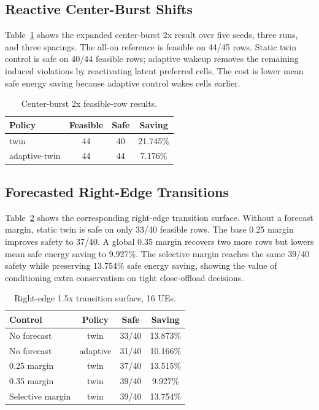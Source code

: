 \documentclass[10pt,twocolumn]{article}
\begin{document}
\subsection{Reactive Center-Burst Shifts}

Table~\ref{tab:center} shows the expanded center-burst 2x result over five
seeds, three runs, and three spacings.  The all-on reference is feasible on
44/45 rows.  Static twin control is safe on 40/44 feasible rows; adaptive
wakeup removes the remaining induced violations by reactivating latent preferred
cells.  The cost is lower mean safe energy saving because adaptive control wakes
cells earlier.

\begin{table}[H]
\centering
\caption{Center-burst 2x feasible-row results.}
\label{tab:center}
\begin{tabular}{lccc}
\toprule
Policy & Feasible & Safe & Saving \\
\midrule
twin & 44 & 40 & 21.745\% \\
adaptive-twin & 44 & 44 & 7.176\% \\
\bottomrule
\end{tabular}
\end{table}

\subsection{Forecasted Right-Edge Transitions}

Table~\ref{tab:right-edge} shows the corresponding right-edge transition
surface.  Without a forecast margin, static twin is safe on only 33/40 feasible
rows.  The base 0.25 margin improves safety to 37/40.  A global 0.35 margin
recovers two more rows but lowers mean safe energy saving to 9.927\%.  The
selective margin reaches the same 39/40 safety while preserving 13.754\% safe
energy saving, showing the value of conditioning extra conservatism on tight
close-offload decisions.

\begin{table}[H]
\centering
\caption{Right-edge 1.5x transition surface, 16 UEs.}
\label{tab:right-edge}
\begin{tabular}{lccc}
\toprule
Control & Policy & Safe & Saving \\
\midrule
No forecast & twin & 33/40 & 13.873\% \\
No forecast & adaptive & 31/40 & 10.166\% \\
0.25 margin & twin & 37/40 & 13.515\% \\
0.35 margin & twin & 39/40 & 9.927\% \\
Selective margin & twin & 39/40 & 13.754\% \\
\bottomrule
\end{tabular}
\end{table}
\end{document}
